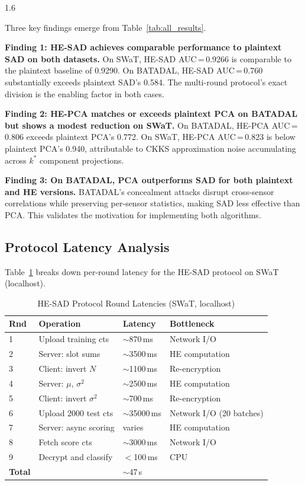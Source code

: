 \begin{spacing}{1.6}

Three key findings emerge from Table~\ref{tab:all_results}.

\textbf{Finding 1: HE-SAD achieves comparable performance to plaintext SAD
on both datasets.} On SWaT, HE-SAD AUC\,=\,0.9266 is comparable to the
plaintext baseline of 0.9290. On BATADAL, HE-SAD AUC\,=\,0.760 substantially
exceeds plaintext SAD's 0.584. The multi-round protocol's exact division is
the enabling factor in both cases.

\textbf{Finding 2: HE-PCA matches or exceeds plaintext PCA on BATADAL but
shows a modest reduction on SWaT.} On BATADAL, HE-PCA AUC\,=\,0.806
exceeds plaintext PCA's 0.772. On SWaT, HE-PCA AUC\,=\,0.823 is below
plaintext PCA's 0.940, attributable to CKKS approximation noise accumulating
across $k^*$ component projections.

\textbf{Finding 3: On BATADAL, PCA outperforms SAD for both plaintext and
HE versions.} BATADAL's concealment attacks disrupt cross-sensor correlations
while preserving per-sensor statistics, making SAD less effective than PCA.
This validates the motivation for implementing both algorithms.

\subsection{Protocol Latency Analysis}

Table~\ref{tab:latency} breaks down per-round latency for the HE-SAD
protocol on SWaT (localhost).

\end{spacing}

\begin{table}[!ht]
\centering
\caption{HE-SAD Protocol Round Latencies (SWaT, localhost)}
\label{tab:latency}
\begin{tabular}{p{0.6cm}p{5cm}p{3cm}p{3cm}}
\toprule
\textbf{Rnd} & \textbf{Operation} & \textbf{Latency} & \textbf{Bottleneck} \\
\midrule
1 & Upload training cts       & $\sim$870\,ms   & Network I/O \\
2 & Server: slot sums         & $\sim$3500\,ms  & HE computation \\
3 & Client: invert $N$        & $\sim$1100\,ms  & Re-encryption \\
4 & Server: $\mu$, $\sigma^2$ & $\sim$2500\,ms  & HE computation \\
5 & Client: invert $\sigma^2$ & $\sim$700\,ms   & Re-encryption \\
6 & Upload 2000 test cts      & $\sim$35000\,ms & Network I/O (20 batches) \\
7 & Server: async scoring     & varies          & HE computation \\
8 & Fetch score cts           & $\sim$3000\,ms  & Network I/O \\
9 & Decrypt and classify      & $<$100\,ms      & CPU \\
\midrule
\textbf{Total} & & $\sim$47\,s & \\
\bottomrule
\end{tabular}
\end{table}

